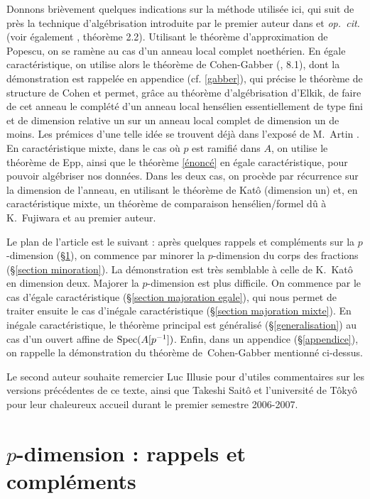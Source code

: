 \documentclass[10pt]{smfart-moi}
\begin{document}
Donnons brièvement quelques indications sur la méthode utilisée ici,
qui suit de près la technique d'algébrisation introduite par
le premier auteur dans \cite{Conference-Illusie@Gabber} et
\emph{op. cit.} (voir également \cite{Hasse@Matsumi}, théorème 2.2). 
Utilisant le théorème 
d'approximation de Popescu, on se ramène au cas d'un anneau local complet
noethérien. En égale caractéristique, on utilise alors le théorème
de Cohen-Gabber (\cite{Conference-Illusie@Gabber}, 8.1), dont la démonstration 
est rappelée en appendice (cf. \ref{gabber}), qui précise
le théorème de structure de Cohen et permet, grâce au 
théorème d'algébrisation d'Elkik, de faire de cet anneau
le complété d'un anneau local hensélien essentiellement de type fini et 
de dimension relative un sur un anneau local complet de dimension un de moins. 
Les prémices d'une
telle idée se trouvent déjà dans l'exposé de M. Artin .
En caractéristique mixte, dans le cas où $p$ est ramifié dans $A$,
on utilise le théorème de Epp,
ainsi que le théorème \ref{énoncé} en égale caractéristique, pour pouvoir
algébriser nos données.  Dans les deux cas, on procède par récurrence
sur la dimension de l'anneau, 
en utilisant le théorème de Katô (dimension un) et, en caractéristique mixte, 
un théorème de comparaison hensélien/formel dû à K. Fujiwara et au premier
auteur.

Le plan de l'article est le suivant : après quelques rappels et compléments
sur la $p$-dimension (§\ref{rappels}), on commence par minorer la $p$-dimension du corps
des fractions (§\ref{section minoration}). La démonstration est très semblable à celle de K. Katô
en dimension deux. Majorer la $p$-dimension est plus difficile. On commence
par le cas d'égale caractéristique (§\ref{section majoration egale}),
qui nous permet de traiter ensuite 
le cas d'inégale caractéristique (§\ref{section majoration mixte}). 
En inégale caractéristique, le théorème principal est généralisé
(§\ref{generalisation}) au cas d'un ouvert affine de $\mathrm{Spec}(A[p^{-1}])$.
Enfin, dans un appendice (§\ref{appendice}), on rappelle
la démonstration du théorème de Cohen-Gabber mentionné ci-dessus.

\vskip1cm
Le second auteur souhaite remercier Luc Illusie pour d'utiles
commentaires sur les versions précédentes de ce texte, ainsi
que Takeshi Saitô et l'université de Tôkyô pour leur
chaleureux accueil durant le premier semestre 2006-2007.

\section{$p$-dimension : rappels et compléments}\label{rappels}
\end{document}
